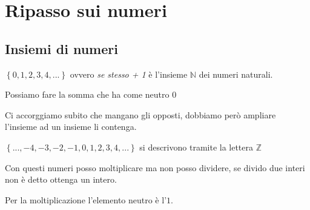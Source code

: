 \chapter{Ripasso sui numeri}

\section{Insiemi di numeri}

$\left\{ 0,1,2,3,4,...\right\}$ ovvero \textit{se stesso + 1} è l'insieme $\mathbb{N}$ dei numeri naturali.

Possiamo fare la somma che ha come neutro 0

Ci accorggiamo subito che mangano gli opposti, dobbiamo però ampliare l'insieme ad un insieme li contenga.

$\left\{ ...,-4,-3,-2,-1,0,1,2,3,4,...\right\}$ si descrivono tramite la lettera $\mathbb{Z}$

Con questi numeri posso moltiplicare ma non posso dividere, se divido due interi non è detto ottenga un intero.

Per la moltiplicazione l'elemento neutro è l'$1$.